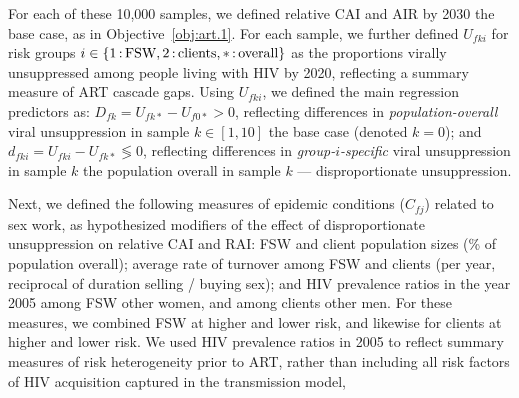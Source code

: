 \par
For each of these 10,000 samples, we defined
relative CAI and AIR by 2030 \vs the base case, as in Objective~\ref{obj:art.1}.
For each sample, we further defined
$U_{fki}$ for risk groups $i \in \{1{\,:\,}\textnormal{FSW}, 2{\,:\,}\textnormal{clients}, *{\,:\,}\textnormal{overall}\}$
as the proportions virally unsuppressed among people living with HIV by 2020,
reflecting a summary measure of ART cascade gaps.
Using $U_{fki}$, we defined the main regression predictors as:
$D_{fk} = U_{fk*} - U_{f0*} > 0$, reflecting differences in
\emph{population-overall} viral unsuppression in sample $k \in [1,10]$
\vs the base case (denoted $k = 0$); and
$d_{fki} = U_{fki} - U_{fk*} \lessgtr 0$, reflecting differences in
\emph{group-$i$-specific} viral unsuppression in sample $k$
\vs the population overall in sample $k$ --- \ie disproportionate unsuppression.
\par
Next, we defined the following measures of epidemic conditions ($C_{fj}$) related to sex work,
as hypothesized modifiers of the effect of disproportionate unsuppression on relative CAI and RAI:
FSW and client population sizes (\% of population overall);
average rate of turnover among FSW and clients (per year, reciprocal of duration selling / buying sex); and
HIV prevalence ratios in the year 2005 among FSW \vs other women, and among clients \vs other men.
For these measures, we combined FSW at higher and lower risk,
and likewise for clients at higher and lower risk.
We used HIV prevalence ratios in 2005 to reflect summary measures of risk heterogeneity prior to ART,
rather than including all risk factors of HIV acquisition captured in the transmission model,
